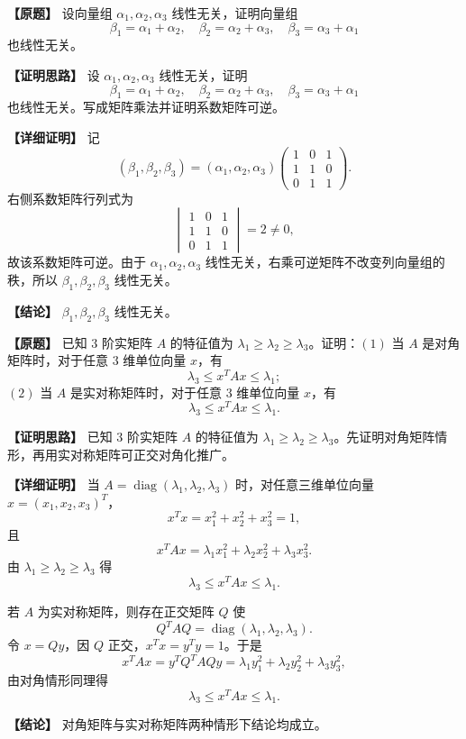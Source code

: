 \documentclass[11pt,a4paper,UTF8]{ctexart}
\newcommand{\diag}{\operatorname{diag}}
\begin{document}
\begin{answerbox}
\textbf{【原题】} 设向量组 $\alpha_1,\alpha_2,\alpha_3$ 线性无关，证明向量组
\[
\beta_1=\alpha_1+\alpha_2,\quad
\beta_2=\alpha_2+\alpha_3,\quad
\beta_3=\alpha_3+\alpha_1
\]
也线性无关。

\textbf{【证明思路】} 设 $\alpha_1,\alpha_2,\alpha_3$ 线性无关，证明
\[
\beta_1=\alpha_1+\alpha_2,\quad \beta_2=\alpha_2+\alpha_3,\quad \beta_3=\alpha_3+\alpha_1
\]
也线性无关。写成矩阵乘法并证明系数矩阵可逆。

\textbf{【详细证明】} 记
\[
(\beta_1,\beta_2,\beta_3)=(\alpha_1,\alpha_2,\alpha_3)
\begin{pmatrix}1&0&1\\1&1&0\\0&1&1\end{pmatrix}.
\]
右侧系数矩阵行列式为
\[
\begin{vmatrix}1&0&1\\1&1&0\\0&1&1\end{vmatrix}=2\ne0,
\]
故该系数矩阵可逆。由于 $\alpha_1,\alpha_2,\alpha_3$ 线性无关，右乘可逆矩阵不改变列向量组的秩，所以 $\beta_1,\beta_2,\beta_3$ 线性无关。

\textbf{【结论】} $\beta_1,\beta_2,\beta_3$ 线性无关。
\end{answerbox}

\begin{answerbox}
\textbf{【原题】} 已知 $3$ 阶实矩阵 $A$ 的特征值为 $\lambda_1\ge\lambda_2\ge\lambda_3$。证明：$(1)$ 当 $A$ 是对角矩阵时，对于任意 $3$ 维单位向量 $x$，有
\[
\lambda_3\le x^TAx\le \lambda_1;
\]
$(2)$ 当 $A$ 是实对称矩阵时，对于任意 $3$ 维单位向量 $x$，有
\[
\lambda_3\le x^TAx\le \lambda_1.
\]

\textbf{【证明思路】} 已知 $3$ 阶实矩阵 $A$ 的特征值为 $\lambda_1\ge\lambda_2\ge\lambda_3$。先证明对角矩阵情形，再用实对称矩阵可正交对角化推广。

\textbf{【详细证明】} 当 $A=\diag(\lambda_1,\lambda_2,\lambda_3)$ 时，对任意三维单位向量 $x=(x_1,x_2,x_3)^T$，
\[
x^Tx=x_1^2+x_2^2+x_3^2=1,
\]
且
\[
x^TAx=\lambda_1x_1^2+\lambda_2x_2^2+\lambda_3x_3^2.
\]
由 $\lambda_1\ge\lambda_2\ge\lambda_3$ 得
\[
\lambda_3\le x^TAx\le \lambda_1.
\]

若 $A$ 为实对称矩阵，则存在正交矩阵 $Q$ 使
\[
Q^TAQ=\diag(\lambda_1,\lambda_2,\lambda_3).
\]
令 $x=Qy$，因 $Q$ 正交，$x^Tx=y^Ty=1$。于是
\[
x^TAx=y^TQ^TAQy
=\lambda_1y_1^2+\lambda_2y_2^2+\lambda_3y_3^2,
\]
由对角情形同理得
\[
\lambda_3\le x^TAx\le \lambda_1.
\]

\textbf{【结论】} 对角矩阵与实对称矩阵两种情形下结论均成立。
\end{answerbox}
\end{document}
